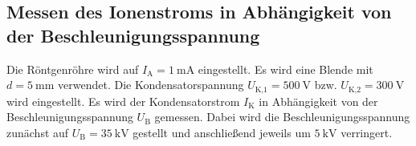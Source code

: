 \subsection{Messen des Ionenstroms in Abhängigkeit von der Beschleunigungsspannung}
Die Röntgenröhre wird auf $I_\text{A} = \SI{1}{\milli\ampere}$
eingestellt. Es wird eine Blende mit $d = \SI{5}{\milli\meter}$
verwendet. Die Kondensatorspannung $U_\text{K,1} = \SI{500}{\volt}$
bzw. $U_\text{K,2} = \SI{300}{\volt}$ wird eingestellt.
\newline
Es wird der Kondensatorstrom $I_\text{K}$ in Abhängigkeit von
der Beschleunigungsspannung $U_\text{B}$ gemessen.
Dabei wird die Beschleunigungsspannung zunächst auf
$U_\text{B} = \SI{35}{\kilo\volt}$ gestellt und anschließend
jeweils um $\SI{5}{\kilo\volt}$ verringert.

